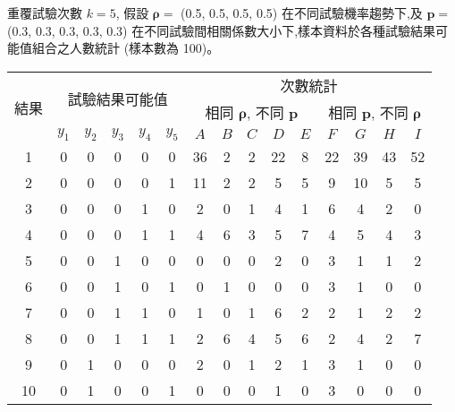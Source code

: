 \begin{small}
\begin{threeparttable}[h]
    \centering
    \caption{重覆試驗次數 $k=5$, 假設 $\bm{\rho}=$ (0.5, 0.5, 0.5, 0.5) 在不同試驗機率趨勢下,及 $\bm{p}=$ (0.3, 0.3, 0.3, 0.3, 0.3) 在不同試驗間相關係數大小下,樣本資料於各種試驗結果可能值組合之人數統計 (樣本數為 100)。}
    \label{tab:r5sample}
    \tabcolsep=8pt
    \begin{tabular}{c|ccccc|ccccc|cccc}
    \hline
\multirow{3}{*}{結果}  &\multicolumn{5}{c|}{\multirow{2}{*}{試驗結果可能值}}  &\multicolumn{9}{c}{次數統計} \\[3pt]\cline{7-15}
                       &\multicolumn{5}{c|}{}                                 &\multicolumn{5}{c|}{相同 $\bm{\rho}$, 不同 $\bm{p}$\tnote{$\ast$}}\vline &\multicolumn{4}{c}{相同 $\bm{p}$, 不同 $\bm{\rho}$\tnote{$\ast$}} \\[2pt]\cline{2-15}
                       & $y_1$ &  $y_2$& $y_3$ & $y_4$ & $y_5$ &  $A$  & $B$   &  $C$  &  $D$ &  $E$ & $F$  &  $G$  &  $H$  &  $I$ \\[2pt]\hline
1   &   0   &   0   &   0   &   0   &   0   &   36  &   2   &   2   &   22  &   8   &   22  &   39  &   43  &   52  \\
2   &   0   &   0   &   0   &   0   &   1   &   11  &   2   &   2   &   5   &   5   &   9   &   10  &   5   &   5   \\
3   &   0   &   0   &   0   &   1   &   0   &   2   &   0   &   1   &   4   &   1   &   6   &   4   &   2   &   0   \\
4   &   0   &   0   &   0   &   1   &   1   &   4   &   6   &   3   &   5   &   7   &   4   &   5   &   4   &   3   \\
5   &   0   &   0   &   1   &   0   &   0   &   0   &   0   &   0   &   2   &   0   &   3   &   1   &   1   &   2   \\
6   &   0   &   0   &   1   &   0   &   1   &   0   &   1   &   0   &   0   &   0   &   3   &   1   &   0   &   0   \\
7   &   0   &   0   &   1   &   1   &   0   &   1   &   0   &   1   &   6   &   2   &   2   &   1   &   2   &   2   \\
8   &   0   &   0   &   1   &   1   &   1   &   2   &   6   &   4   &   5   &   6   &   2   &   4   &   2   &   7   \\
9   &   0   &   1   &   0   &   0   &   0   &   2   &   0   &   1   &   2   &   1   &   3   &   1   &   0   &   0   \\
10  &   0   &   1   &   0   &   0   &   1   &   0   &   0   &   0   &   1   &   0   &   3   &   0   &   0   &   0   \\

\end{tabular}
\end{threeparttable}
\end{small}
